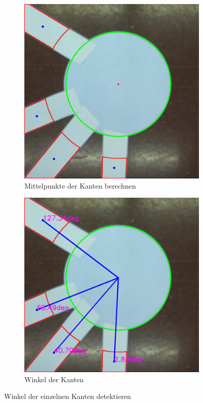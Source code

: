 \begin{enumerate}
\begin{figure}[H]
\begin{subfigure}{0.4\textwidth}
        \includegraphics[width=0.95\linewidth]{assets/informatik-prototyp/opencv/angle_detection/edge_detect_centers.png} 
        \caption{Mittelpunkte der Kanten berechnen}
        \label{fig:edge-center}
        \end{subfigure}
        \begin{subfigure}{0.4\textwidth}
        \centering
        \includegraphics[width=0.95\linewidth]{assets/informatik-prototyp/opencv/angle_detection/node_with_edge_angles_annotated.png} 
        \caption{Winkel der Kanten}
        \label{fig:angle-lines}
        \end{subfigure}
        \caption{Winkel der einzelnen Kanten detektieren}
        \label{fig:node-with-edge-angles}
        \end{figure}
\end{enumerate}

